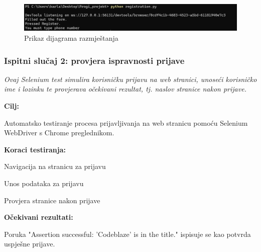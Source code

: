 						\begin{figure} [H]
							\centering
							\includegraphics[width=0.7\linewidth]{slike/RegisterSeleniumOutput.png}
							\caption{Prikaz dijagrama razmještanja}
							\label{fig:Prikaz dijagrama razmještanja}
						\end{figure}

                        


            \subsubsection{Ispitni slučaj 2: provjera ispravnosti prijave}

                        \textit{Ovaj Selenium test simulira korisničku prijavu na web stranici, unoseći korisničko ime i lozinku te provjerava očekivani rezultat, tj. naslov stranice nakon prijave.}
                        
                        \noindent\textbf{Cilj:}
                        \begin{packed_item}
                        	Automatsko testiranje procesa prijavljivanja na web stranicu pomoću Selenium WebDriver s Chrome preglednikom.
                        \end{packed_item}
                        
                        \noindent\textbf{Koraci testiranja:}
                        \begin{packed_item}
                        	\item Navigacija na stranicu za prijavu
                        	\item  Unos podataka za prijavu
                        	\item Provjera stranice nakon prijave
                        	
                        \end{packed_item}
                        \noindent\textbf{Očekivani rezultati:}
                        \begin{packed_item}
                        	\item  Poruka "Assertion successful: 'Codeblaze' is in the title." ispisuje se kao potvrda uspješne prijave.
                        \end{packed_item}
                                                             

